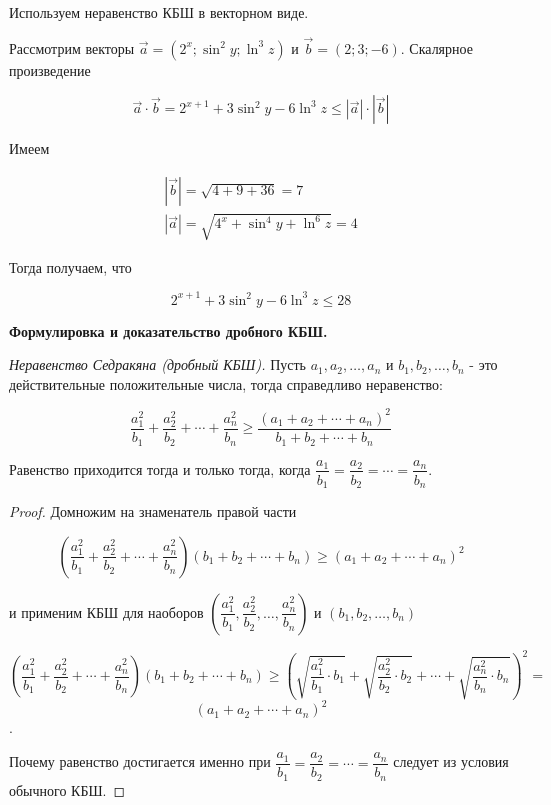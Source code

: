 Используем неравенство КБШ в векторном виде.

Рассмотрим векторы $\vec{a}=\left(2^x ; \sin ^2 y ; \ln ^3 z\right)$ и $\vec{b}=(2 ; 3 ;-6)$. Скалярное произведение

$$
\vec{a} \cdot \vec{b}=2^{x+1}+3 \sin ^2 y-6 \ln ^3 z \leqslant|\vec{a}| \cdot|\vec{b}|
$$


Имеем

$$
\begin{gathered}
|\vec{b}|=\sqrt{4+9+36}=7 \\
|\vec{a}|=\sqrt{4^x+\sin ^4 y+\ln ^6 z}=4
\end{gathered}
$$


Тогда получаем, что

$$
2^{x+1}+3 \sin ^2 y-6 \ln ^3 z \leqslant 28
$$


\newpage

\hspace{3mm}

\centerline{\bf \large Формулировка и доказательство дробного КБШ.}

\textit{Неравенство Седракяна (дробный КБШ).}
Пусть $a_1, a_2, \ldots, a_n$ и $b_1, b_2, \ldots, b_n$ - это действительные положительные числа, тогда справедливо неравенство:

$$
\dfrac{a_1^2}{b_1}+\dfrac{a_2^2}{b_2}+\cdots+\dfrac{a_n^2}{b_n} \geqslant \dfrac{\left(a_1+a_2+\cdots+a_n\right)^2}{b_1+b_2+\cdots+b_n}
$$

Равенство приходится тогда и только тогда, когда $\dfrac{a_1}{b_1}=\dfrac{a_2}{b_2}=\cdots=\dfrac{a_n}{b_n}$.

\begin{proof}

    Домножим на знаменатель правой части
    
    $$
    \left(\dfrac{a_1^2}{b_1}+\dfrac{a_2^2}{b_2}+\cdots+\dfrac{a_n^2}{b_n}\right)\left(b_1+b_2+\cdots+b_n\right) \geqslant\left(a_1+a_2+\cdots+a_n\right)^2
    $$
    
    и применим КБШ для наоборов $\left(\dfrac{a_1^2}{b_1}, \dfrac{a_2^2}{b_2}, \ldots, \dfrac{a_n^2}{b_n}\right)$ и $\left(b_1, b_2, \ldots, b_n\right)$

    $$
    \left(\dfrac{a_1^2}{b_1}+\dfrac{a_2^2}{b_2}+\cdots+\dfrac{a_n^2}{b_n}\right)\left(b_1+b_2+\cdots+b_n\right) \geqslant\left(\sqrt{\dfrac{a_1^2}{b_1} \cdot b_1}+\sqrt{\dfrac{a_2^2}{b_2} \cdot b_2}+\cdots+\sqrt{\dfrac{a_n^2}{b_n} \cdot b_n}\right)^2=
    $$
    $$
    \left(a_1+a_2+\cdots+a_n\right)^2
    $$.

    Почему равенство достигается именно при $\dfrac{a_1}{b_1}=\dfrac{a_2}{b_2}=\cdots=\dfrac{a_n}{b_n}$ следует из условия обычного КБШ.


\end{proof}


